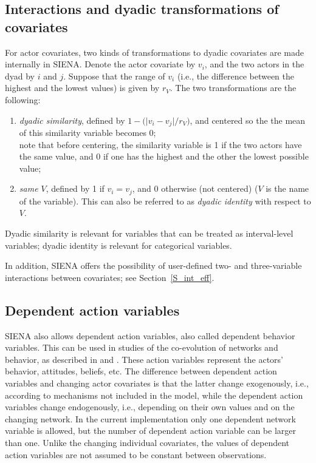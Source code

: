 \documentclass[a4paper,fleqn]{article}
\newcommand{\+}{\, + \,}
\newcommand{\SI}{{\sf SIENA }}
\newcommand{\si}{{\sf SIENA}}
\begin{document}
{\subsection{Interactions and dyadic transformations of covariates}

For actor covariates, two kinds of transformations to dyadic covariates
are made internally in \si. Denote the actor covariate by $v_i$,
and the two actors in the dyad by $i$ and $j$.
Suppose that the range of $v_i$ (i.e., the difference between the
highest and the lowest values) is given by $r_V$.
The two transformations are the following:
\begin{enumerate}
\item \emph{dyadic similarity}, defined by $ 1 - \big( \vert v_i - v_j \vert / r_V \big) $,
      and centered so the the mean of this similarity variable becomes 0;\\
      note that before centering, the similarity variable is 1 if
      the two actors have the same value, and 0 if one has the highest and the
      other the lowest possible value;
\item \emph{same $V$}, defined by 1 if $v_i = v_j$,
      and 0 otherwise (not centered) ($V$ is the name of the variable).
      This can also be referred to as \emph{dyadic identity} with respect to $V$.
\end{enumerate}
Dyadic similarity is relevant for variables that can be treated as interval-level
variables; dyadic identity is relevant for categorical variables.


In addition, \SI offers the possibility of user-defined two- and three-variable
interactions between covariates; see Section~\ref{S_int_eff}.


\subsection{Dependent action variables}
\label{S_depaction}

\SI also allows dependent action variables,
also called dependent behavior variables. This can be used in studies
of the co-evolution of networks and behavior, as described
in \citet*{SnijdersEA07} and \citet*{SteglichEA10}.
These action variables represent the actors' behavior, attitudes, beliefs, etc.
The difference between dependent action variables and changing actor
covariates is that the latter change exogenously, i.e., according
to mechanisms not included in the model, while the dependent
action variables change endogenously, i.e.,
depending on their own values and on the changing network.
In the current implementation only one dependent network variable is
allowed, but the number of dependent action variable can be larger than one.
Unlike the changing individual covariates,
the values of dependent action variables are not assumed to be
constant between observations.

}
\end{document}
